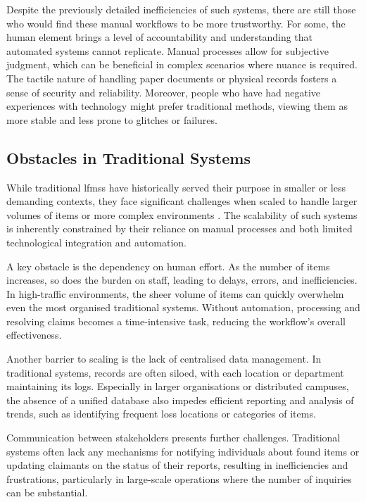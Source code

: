 Despite the previously detailed inefficiencies of such systems, there are still those who would find these manual workflows to be more trustworthy. For some, the human element brings a level of accountability and understanding that automated systems cannot replicate. Manual processes allow for subjective judgment, which can be beneficial in complex scenarios where nuance is required. The tactile nature of handling paper documents or physical records fosters a sense of security and reliability. Moreover, people who have had negative experiences with technology might prefer traditional methods, viewing them as more stable and less prone to glitches or failures.


\subsection{Obstacles in Traditional Systems} \label{subsec:obstacles-traditional-systems}

While traditional \acp{lfms} have historically served their purpose in smaller or less demanding contexts, they face significant challenges when scaled to handle larger volumes of items or more complex environments \cite{Mayura2024}. The scalability of such systems is inherently constrained by their reliance on manual processes and both limited technological integration and automation.

A key obstacle is the dependency on human effort. As the number of items increases, so does the burden on staff, leading to delays, errors, and inefficiencies. In high-traffic environments, the sheer volume of items can quickly overwhelm even the most organised traditional systems. Without automation, processing and resolving claims becomes a time-intensive task, reducing the workflow's overall effectiveness. 

Another barrier to scaling is the lack of centralised data management. In traditional systems, records are often siloed, with each location or department maintaining its logs. Especially in larger organisations or distributed campuses, the absence of a unified database also impedes efficient reporting and analysis of trends, such as identifying frequent loss locations or categories of items.

Communication between stakeholders presents further challenges. Traditional systems often lack any mechanisms for notifying individuals about found items or updating claimants on the status of their reports, resulting in inefficiencies and frustrations, particularly in large-scale operations where the number of inquiries can be substantial.

